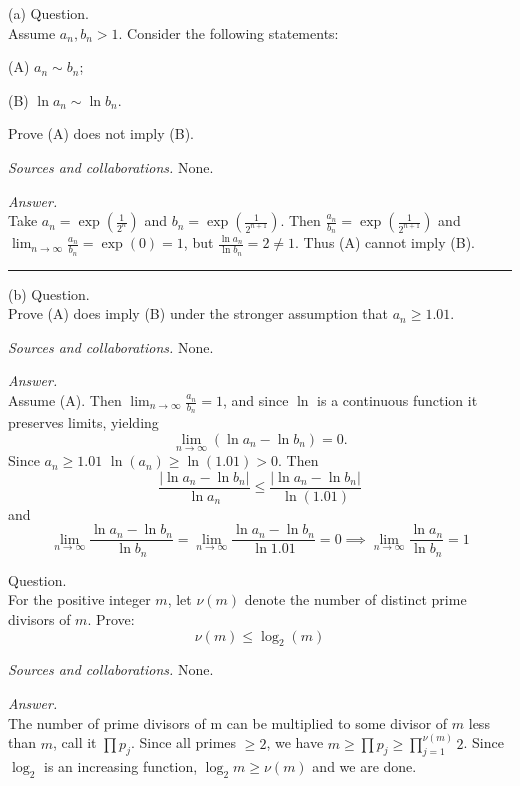 \documentclass{amsart}
\begin{document}
(a) Question.\\
Assume $a_n, b_n>1$. Consider the following statements:

(A) $a_n \sim b_n$;

(B) $\ln a_n \sim \ln b_n$.

\noindent Prove (A) does not imply (B).

\medskip\noindent
\emph{Sources and collaborations.}
None.

\medskip \noindent 
\emph{Answer.}\\
Take $a_n = \exp(\frac{1}{2^n})$ and $b_n = \exp(\frac{1}{2^{n+1}})$. Then $\frac{a_n}{b_n}=\exp(\frac{1}{2^{n+1}})$ and $\lim_{n\to\infty}\frac{a_n}{b_n} = \exp(0)=1$, but $\frac{\ln a_n}{\ln b_n}=2\neq 1$. Thus (A) cannot imply (B).

\bigskip \hrule
\vspace{0.5cm}

(b) Question.\\
Prove (A) does imply (B) under the stronger assumption that $a_n\geq 1.01$.

\medskip \noindent 
\emph{Sources and collaborations.}
None.

\medskip \noindent 
\emph{Answer.}\\
Assume (A). Then $\lim_{n\to\infty} \frac{a_n}{b_n} = 1$, and since $\ln$ is a continuous
function it preserves limits, yielding \[\lim_{n\to\infty}(\ln a_n - \ln b_n) = 0.\] Since $a_n\geq 1.01$ $\ln(a_n)\geq \ln(1.01)>0$. Then \[\frac{|\ln a_n-\ln b_n|}{\ln a_n}\leq\frac{|\ln a_n-\ln b_n|}{\ln(1.01)}\] and \[\lim_{n\to\infty}\frac{\ln a_n-\ln b_n}{\ln b_n}=\lim_{n\to\infty}\frac{\ln a_n-\ln b_n}{\ln 1.01}= 0\implies \lim_{n\to\infty}\frac{\ln a_n}{\ln b_n} = 1\]

\newpage
{}

 Question.\\
For the positive integer $m$, let $\nu(m)$ denote the number of distinct prime divisors of $m$. Prove: \[\nu(m)\leq \log_2(m)\]

\medskip\noindent
\emph{Sources and collaborations.}
None.

\medskip \noindent
\emph{Answer.}\\
The number of prime divisors of m can be multiplied to some divisor of $m$ less than $m$, call it $\prod p_j$. Since all primes $\geq 2$, we have $m\geq\prod p_j\geq \prod_{j=1}^{\nu(m)} 2$. Since $\log_2$ is an increasing function, $\log_2 m \geq \nu(m)$ and we are done.
\end{document}
